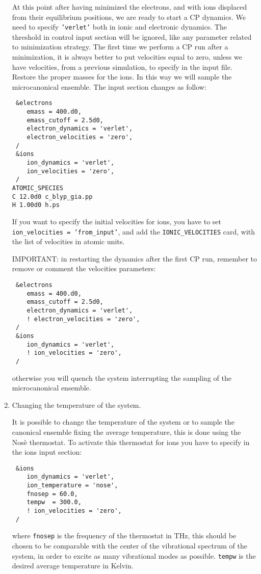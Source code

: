 \documentclass[12pt,a4paper]{article}
\begin{document}
\begin{enumerate}
    At this point after having minimized the electrons, and with ions
    displaced from their equilibrium positions, we are ready to start
    a CP dynamics.
    We need to specify \texttt{'verlet'} both in ionic and electronic
    dynamics.
    The threshold in control input section will be ignored, like any
    parameter related to minimization strategy.
    The first time we perform a CP run after a minimization, it is
    always better to put velocities equal to zero, unless we have
    velocities, from a previous simulation, to specify in the input
    file.
    Restore the proper masses for the ions.
    In this way we will sample the microcanonical ensemble.
    The input section changes as follow:
\begin{verbatim}
 &electrons
    emass = 400.d0,
    emass_cutoff = 2.5d0,
    electron_dynamics = 'verlet',
    electron_velocities = 'zero',
 /
 &ions
    ion_dynamics = 'verlet',
    ion_velocities = 'zero',
 /
ATOMIC_SPECIES
C 12.0d0 c_blyp_gia.pp
H 1.00d0 h.ps
\end{verbatim}
    If you want to specify the initial velocities for ions, you have
    to set \texttt{ion\_velocities = 'from\_input'}, and add the
    \texttt{IONIC\_VELOCITIES}\break
    card, with the list of velocities in atomic units.

    IMPORTANT: in restarting the dynamics after the first CP run,
    remember to remove or comment the velocities parameters:
\begin{verbatim}
 &electrons
    emass = 400.d0,
    emass_cutoff = 2.5d0,
    electron_dynamics = 'verlet',
    ! electron_velocities = 'zero',
 /
 &ions
    ion_dynamics = 'verlet',
    ! ion_velocities = 'zero',
 /
\end{verbatim}
    otherwise you will quench the system interrupting the sampling of
    the microcanonical ensemble.

  \item
    Changing the temperature of the system.

    It is possible to change the temperature of the system or to
    sample the canonical ensemble fixing the average temperature, this
    is done using the Nos\`e thermostat.
    To activate this thermostat for ions you have to specify in the
    ions input section:
\begin{verbatim}
 &ions
    ion_dynamics = 'verlet',
    ion_temperature = 'nose',
    fnosep = 60.0,
    tempw  = 300.0,
    ! ion_velocities = 'zero',
 /
\end{verbatim}
    where \texttt{fnosep} is the frequency of the thermostat in THz,
    this should be chosen to be comparable with the center of the
    vibrational spectrum of the system, in order to excite as many
    vibrational modes as possible.
    \texttt{tempw} is the desired average temperature in Kelvin.


\end{enumerate}
\end{document}
